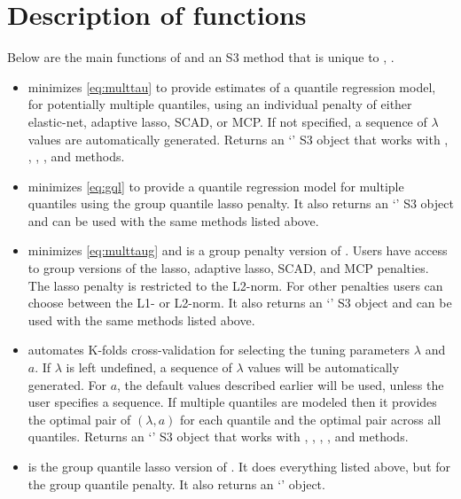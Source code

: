 \section{Description of functions}\label{description-of-functions}

Below are the main functions of  and an S3 method that is unique to , .

\begin{itemize}
\tightlist
\item
   minimizes \eqref{eq:multtau} to provide estimates of a quantile regression model, for potentially multiple quantiles, using an individual penalty of either elastic-net, adaptive lasso, SCAD, or MCP. If not specified, a sequence of \(\lambda\) values are automatically generated. Returns an `' S3 object that works with , , , , and  methods.
\item
   minimizes \eqref{eq:gql} to provide a quantile regression model for multiple quantiles using the group quantile lasso penalty. It also returns an `' S3 object and can be used with the same methods listed above.
\item
   minimizes \eqref{eq:multtaug} and is a group penalty version of . Users have access to group versions of the lasso, adaptive lasso, SCAD, and MCP penalties. The lasso penalty is restricted to the L2-norm. For other penalties users can choose between the L1- or L2-norm. It also returns an `' S3 object and can be used with the same methods listed above.
\item
   automates K-folds cross-validation for selecting the tuning parameters \(\lambda\) and \(a\). If \(\lambda\) is left undefined, a sequence of \(\lambda\) values will be automatically generated. For \(a\), the default values described earlier will be used, unless the user specifies a sequence. If multiple quantiles are modeled then it provides the optimal pair of \((\lambda,a)\) for each quantile and the optimal pair across all quantiles. Returns an `' S3 object that works with , , , , and  methods.
\item
   is the group quantile lasso version of . It does everything listed above, but for the group quantile penalty. It also returns an `' object.

\end{itemize}
